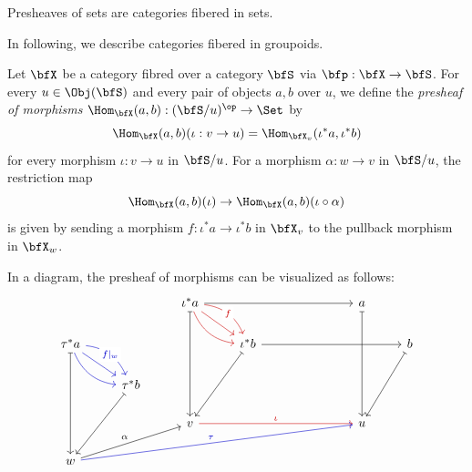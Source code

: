     \begin{example}%
    \end{example}

    \begin{slogan}%
        Presheaves of sets are categories fibered in sets.
    \end{slogan}

    In following, we describe categories fibered in groupoids.

    \begin{definition}%
        Let \(\bfX\) be a category fibred over a category \(\bfS\) via \(\bfp: \bfX \to \bfS\).
        For every \(u \in \Obj(\bfS)\) and every pair of objects \(a,b\) over \(u\), we define the \emph{presheaf of morphisms} \(\Hom_{\bfX}(a,b): (\bfS/u)^{\op} \to \Set\) by
        \[ \Hom_{\bfX}(a,b)(\iota: v \to u) = \Hom_{\bfX_v}(\iota^*a, \iota^*b) \]
        for every morphism \(\iota: v \to u\) in \(\bfS/u\).
        For a morphism \(\alpha: w \to v\) in \(\bfS/u\), the restriction map
        \[ \Hom_{\bfX}(a,b)(\iota) \to \Hom_{\bfX}(a,b)(\iota \circ \alpha) \]
        is given by sending a morphism \(f: \iota^*a \to \iota^*b\) in \(\bfX_v\) to the pullback morphism 
        in \(\bfX_w\).
    \end{definition}

    In a diagram, the presheaf of morphisms can be visualized as follows:
    \[\begin{tikzcd}
        && {\iota^*a} &&&& a \\
        {\tau^*a} &&& {\iota^*b} &&&& b \\
        & {\tau^*b} \\
        && v &&&& u \\
        w
        \arrow[from=1-3, to=1-7]
        \arrow[bend right,red!80!black, from=1-3, to=2-4]
        \arrow["f"{description}, bend left,red!80!black, from=1-3, to=2-4]
        \arrow[from=1-3,red!80!black, to=2-4]
        \arrow[maps to, from=1-3, to=4-3]
        \arrow[maps to, from=1-7, to=4-7]
        \arrow["{f|_w}"{description},blue!80!black, bend left, from=2-1, to=3-2]
        \arrow[bend right,blue!80!black, from=2-1, to=3-2]
        \arrow[from=2-1,blue!80!black, to=3-2]
        \arrow[maps to, from=2-1, to=5-1]
        \arrow[from=2-4, to=2-8]
        \arrow[maps to, from=2-4, to=4-3]
        \arrow[maps to, from=2-8, to=4-7]
        \arrow[maps to, from=3-2, to=5-1]
        \arrow["\iota",red!80!black,  from=4-3, to=4-7]
        \arrow["\alpha",from=5-1, to=4-3]
        \arrow["\tau", from=5-1, blue!80!black, to=4-7]
    \end{tikzcd}\]

